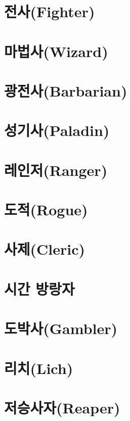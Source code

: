 \documentclass{report}
\begin{document}
	\section{전사(Fighter)}
		
	
	\section{마법사(Wizard)}
		
	
	\section{광전사(Barbarian)}
		
	
	\section{성기사(Paladin)}
		
	
	\section{레인저(Ranger)}
		
	
	\section{도적(Rogue)}
		
	
	\section{사제(Cleric)}
		
	
	\section{시간 방랑자}
		
		
	\section{도박사(Gambler)}
		
	
	\section{리치(Lich)}
		
	
	\section{저승사자(Reaper)}
		
\end{document}
